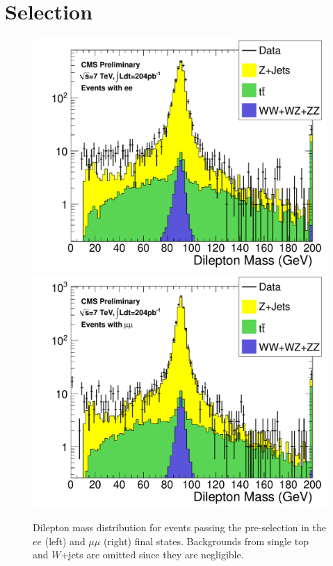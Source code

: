 \section{Selection}
\label{sec:eventSelection}


\begin{figure}[hbt]
\begin{center}
\includegraphics[width=0.48\linewidth]{plots/hdilmass_ee_allj.pdf}
\includegraphics[width=0.48\linewidth]{plots/hdilmass_mm_allj.pdf}
\caption{\label{fig:dilmass}\protect Dilepton mass distribution for events passing the pre-selection
  in the $ee$ (left) and $\mu\mu$ (right) final states. Backgrounds from single top and $W$+jets are omitted
  since they are negligible.}
\end{center}
\end{figure}

